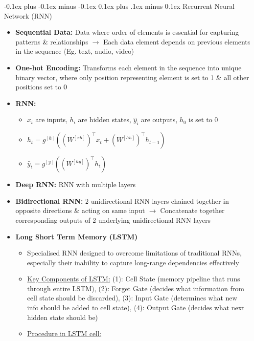 \documentclass[landscape]{article}
\makeatletter
\renewcommand{\subsection}{\@startsection{subsection}{2}{0mm}%
  {-0.1ex plus -0.1ex minus -0.1ex}%
  {0.1ex plus .1ex minus 0.1ex}%
{\normalfont\scriptsize\bfseries}}
\makeatother
\begin{document}
\begin{multicols*}{5}
        \subsection{Recurrent Neural Network (RNN)}
        \begin{itemize}
          \item \textbf{Sequential Data:} Data where order of elements is essential for capturing patterns \& relationships $\rightarrow$ Each data element depends on previous elements in the sequence (Eg. text, audio, video)
          \item \textbf{One-hot Encoding:} Transforms each element in the sequence into unique binary vector, where only position representing element is set to 1 \& all other positions set to 0
          \item \textbf{RNN:}
          \begin{itemize}
            \item $x_i$ are inputs, $h_i$ are hidden states, $\hat{y}_i$ are outputs, $h_0$ is set to 0
            \item $h_t = g^{[h]} \left( \left( W^{[xh]} \right)^\top x_t + \left( W^{[hh]} \right)^\top h_{t-1} \right)$
            \item $\hat{y}_t = g^{[y]} \left( \left( W^{[hy]} \right)^\top h_t \right)$
          \end{itemize}
          \item \textbf{Deep RNN:} RNN with multiple layers
          \item \textbf{Bidirectional RNN:} 2 unidirectional RNN layers chained together in opposite directions \& acting on same input $\rightarrow$ Concatenate together corresponding outputs of 2 underlying unidirectional RNN layers 
          \item \textbf{Long Short Term Memory (LSTM)}
          \begin{itemize}
            \item Specialised RNN designed to overcome limitations of traditional RNNs, especially their inability to capture long-range dependencies effectively
            \item \underline{Key Components of LSTM:} (1): Cell State (memory pipeline that runs through entire LSTM), (2): Forget Gate (decides what information from cell state should be discarded), (3): Input Gate (determines what new info should be added to cell state), (4): Output Gate (decides what next hidden state should be)
            \item \underline{Procedure in LSTM cell:}

\end{itemize}
\end{itemize}
\end{multicols*}
\end{document}
